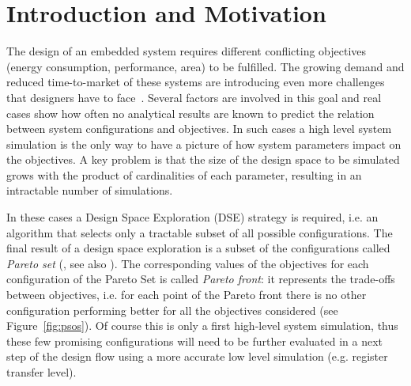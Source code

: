 
\section{Introduction and Motivation}

The design of an embedded system requires different conflicting
objectives (energy consumption, performance, area) to be fulfilled.
The growing demand and reduced time-to-market of these systems are
introducing even more challenges that designers have to
face~\cite{wsts}.
Several factors are involved in this goal and real cases show how
often no analytical results are known to predict the relation between
system configurations and objectives. In such cases a high level
system simulation is the only way to have a picture of how system
parameters impact on the objectives.  A key problem is that the size
of the design space to be simulated grows with the product of
cardinalities of each parameter, resulting in an intractable number
of simulations. 

In these cases a Design Space
Exploration (DSE) strategy is required, i.e. an algorithm that selects
only a tractable subset of all possible configurations.
The final result of a design space exploration is a subset of the
configurations called \emph{Pareto set} (\cite{pareto}, see also
). The corresponding values of the objectives for
each configuration of the Pareto Set is called \emph{Pareto front}:
it represents the trade-offs between objectives, i.e.  for each point
of the Pareto front there is no other configuration performing better
for all the objectives considered (see Figure~\ref{fig:psos}). Of course this is only a first
high-level system simulation, thus these few promising
configurations will need to be further evaluated in a next step of the design
flow using a more accurate low level simulation (e.g. register
transfer level).



